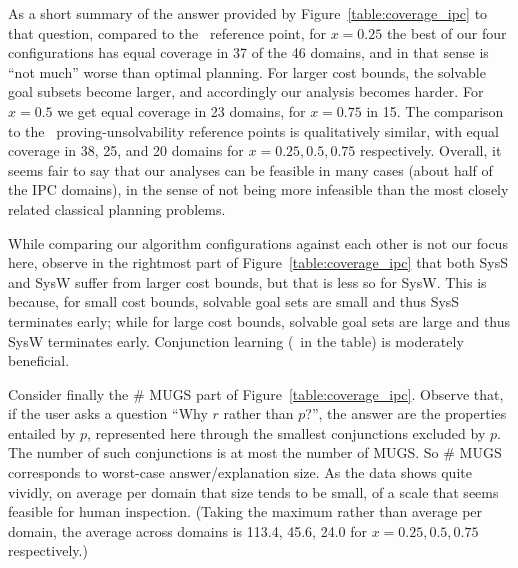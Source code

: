 As a short summary of the answer provided by
Figure~\ref{table:coverage_ipc} to that question, compared to
the \hlmcut\ reference point, for $x=0.25$ the best of our four
configurations has equal coverage in 37 of the 46 domains, and in that
sense is ``not much'' worse than optimal planning. For larger cost
bounds, the solvable goal subsets become larger, and accordingly our
analysis becomes harder. For $x=0.5$ we get equal coverage in 23
domains, for $x=0.75$ in 15. The comparison to the \hc\
proving-unsolvability reference points is qualitatively similar, with
equal coverage in 38, 25, and 20 domains for $x=0.25, 0.5, 0.75$
respectively. Overall, it seems fair to say that our analyses can be
feasible in many cases (about half of the IPC domains), in the sense
of not being more infeasible than the most closely related classical
planning problems.

While comparing our algorithm configurations against each other is not
our focus here, observe in the rightmost part of
Figure~\ref{table:coverage_ipc} that both SysS and SysW suffer from
larger cost bounds, but that is less so for SysW. This is because, for
small cost bounds, solvable goal sets are small and thus SysS
terminates early; while for large cost bounds, solvable goal sets are
large and thus SysW terminates early. Conjunction learning (\hc\ in
the table) is moderately beneficial.
%
%

Consider finally the \# MUGS part of
Figure~\ref{table:coverage_ipc}. Observe that, if the user asks a
question ``Why $r$ rather than $p$?'', the answer are the properties
entailed by $p$, represented here through the smallest conjunctions
excluded by $p$. The number of such conjunctions is at most the number
of MUGS. So \# MUGS corresponds to worst-case answer/explanation
size. As the data shows quite vividly, on average per domain that size
tends to be small, of a scale that seems feasible for human
inspection. (Taking the maximum rather than average per domain, the
average across domains is 113.4, 45.6, 24.0 for $x=0.25, 0.5, 0.75$
respectively.)


